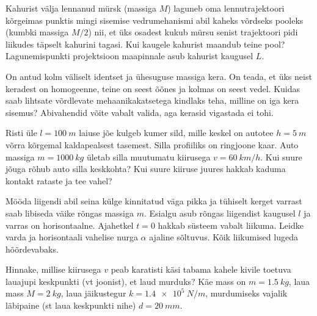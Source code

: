 \documentclass[10pt, twoside]{article}
\begin{document}
{%

Kahurist välja lennanud mürsk (massiga $M$) laguneb oma lennutrajektoori kõrgeimas punktis mingi sisemise vedrumehanismi abil kaheks võrdseks pooleks (kumbki massiga $M/2$) nii, et üks osadest kukub mürsu senist trajektoori pidi liikudes täpselt kahurini tagasi. Kui kaugele kahurist maandub teine pool? Lagunemispunkti projektsioon maapinnale asub kahurist kaugusel $L$.
\probend
\bigskip


On antud kolm väliselt identset ja ühesuguse massiga kera. On teada, et üks
neist keradest on homogeenne, teine on seest õõnes ja kolmas on seest vedel.
Kuidas saab lihtsate võrdlevate mehaanikakatsetega kindlaks teha, milline on iga
kera sisemus? Abivahendid võite vabalt valida, aga kerasid vigastada ei tohi.
\probend
\bigskip


Risti üle $l=\SI{100}{m}$ laiuse jõe kulgeb kumer sild, mille keskel on
autotee $h=\SI{5}{m}$ võrra kõrgemal kaldapealsest tasemest. Silla profiiliks on
ringjoone kaar. Auto massiga $m=\SI{1000}{kg}$ ületab silla muutumatu kiirusega $v=\SI{60}{km/h}$.
Kui suure jõuga rõhub auto silla keskkohta? Kui suure kiiruse juures hakkab kaduma
kontakt rataste ja tee vahel?
\probend
\bigskip


Mööda liigendi abil seina külge kinnitatud väga pikka ja tühiselt
kerget varrast saab libiseda väike rõngas massiga $m$. Esialgu asub rõngas liigendist kaugusel $l$ ja varras on horisontaalne. Ajahetkel $t = \num{0}$ hakkab süsteem
vabalt liikuma. Leidke varda ja horisontaali vahelise nurga $\alpha$ ajaline sõltuvus.
Kõik liikumised lugeda hõõrdevabaks.
\probend
\bigskip


Hinnake, millise kiirusega $v$ peab karatisti käsi tabama kahele kivile toetuva lauajupi keskpunkti (vt joonist), et laud murduks? Käe mass on $m = \SI{1,5}{kg}$, laua mass $M = \SI{2}{kg}$, laua jäikustegur $k = \SI{1,4e5}{N/m}$, murdumiseks vajalik läbipaine (st laua keskpunkti nihe) $d = \SI{20}{mm}$. 

}
\end{document}

